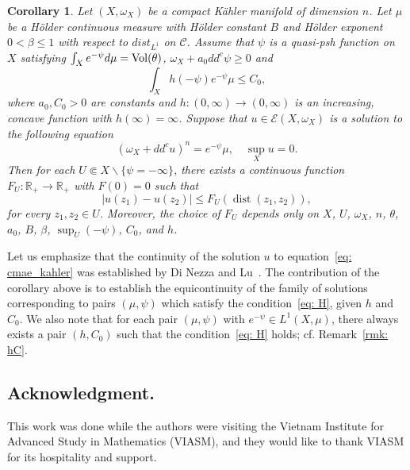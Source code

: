 \documentclass[a4paper,11pt]{amsart}
\numberwithin{equation}{section}
\newtheorem{corollary}[theorem]{Corollary}
\theoremstyle{definition}
\newcommand{\Vol}{{\rm Vol}}
\newcommand{\dist}{\mathop{\mathrm{dist}}\nolimits}
\newcommand{\ddc}{dd^c}
\newcommand{\R}{\mathbb{R}}
\begin{document}
\begin{corollary}\label{coro: main}Let $(X,\omega_X)$ be a compact K\"ahler manifold of dimension $n$.
	Let $\mu$ be a H\"older continuous measure 
	with H\"older constant $B$ and H\"older exponent $0<\beta\leq 1$
	with respect to $dist_{L^1}$ on $\mathcal{C}$.
	Assume that $\psi$ is a quasi-psh function
	on $X$ satisfying $\int_Xe^{-\psi}d\mu=\Vol(\theta)$, $\omega_X+a_0dd^c\psi\geq 0$ and \begin{equation}\label{eq: H}
	    \int_Xh(-\psi)e^{-\psi}\mu\leq C_0,
	\end{equation}
	where $a_0, C_0>0$ are constants and $h: (0, \infty)\rightarrow (0, \infty)$ is an increasing, 
	concave function with $h(\infty)=\infty$. Suppose that  
	$u\in\mathcal{E} (X, \omega_X)$ is a solution to the following equation \begin{equation}\label{eq: cmae_kahler} (\omega_X+\ddc u)^n=e^{-\psi}\mu,\quad\sup_X u=0.\end{equation}
	Then for each $U\Subset X\backslash\{\psi=-\infty\}$, there exists a continuous function $F_U:\R_+\rightarrow\R_+$
	with $F(0)=0$ such that
	$$|u(z_1)-u(z_2)|\leq F_U(\dist (z_1, z_2)),$$
	for every $z_1, z_2\in U$.  Moreover, the choice of $F_U$ depends only on $X$, $U$, $\omega_X$, $n$, $\theta$, $a_0$, $B$, $\beta$, $\sup_U(-\psi)$, $C_0$,
	 and $h$.
\end{corollary}
Let us emphasize that the continuity of the solution $u$ to equation~\eqref{eq: cmae_kahler} was established by Di Nezza and Lu~\cite[Theorem 3.1]{di2017complex}. The contribution of the corollary above is to establish the equicontinuity of the family of solutions corresponding to pairs $(\mu,\psi)$ which satisfy the condition~\eqref{eq: H}, given $h$ and $C_0$. We also note that for each pair $(\mu,\psi)$ with $e^{-\psi}\in L^1(X,\mu)$, there always exists a pair $(h,C_0)$ such that the condition~\eqref{eq: H} holds; cf. Remark~\ref{rmk: hC}. 




\subsection*{Acknowledgment.}  
This work was done while the authors were visiting the Vietnam Institute for Advanced Study in Mathematics (VIASM), and they would like to thank VIASM for its hospitality and support.
\end{document}
